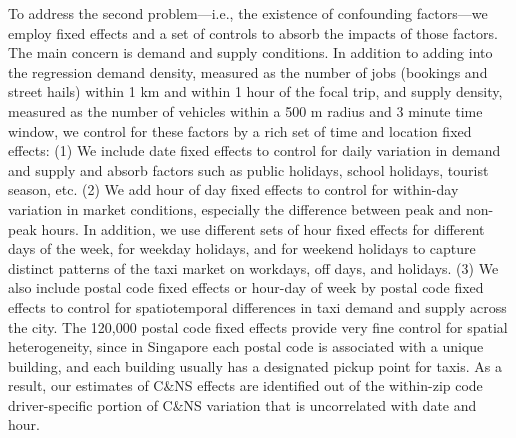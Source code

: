 \documentclass[reviewmode,AEJ]{AEA}
\begin{document}
To address the second problem---i.e., the existence of confounding factors---we employ fixed effects and a
set of controls to absorb the impacts of those factors. The main concern is demand and supply conditions.
In addition to adding  into the regression demand density, measured as the number of jobs (bookings and street 
hails) within 1 km and within 1 hour of the focal trip, and supply density, measured as the number of vehicles
within a 500 m radius and 3 minute time window, we control for these factors by a rich set of time and
location fixed effects: (1) We include date fixed effects to control for daily variation in demand and 
supply and absorb factors such as public holidays, school holidays, tourist season, etc. (2) We add hour 
of day fixed effects to control for within-day variation in market conditions, especially the difference 
between peak and non-peak hours. In addition, we use different sets of hour fixed effects for different days 
of the week, for weekday holidays, and for weekend holidays to capture distinct patterns of the taxi market on 
workdays, off days, and holidays. 
(3)  We also include postal code fixed effects or hour-day of week by postal code fixed effects to control 
for spatiotemporal differences in taxi demand and supply across the city.
The 120,000 postal code fixed effects provide very fine control for spatial 
heterogeneity, since in Singapore each postal code is associated with a unique building, and each building
usually has a designated pickup point for taxis. As a result, our estimates of C\&NS effects are identified 
out of the within-zip code driver-specific portion of C\&NS variation that is uncorrelated with date and hour. 
\end{document}

